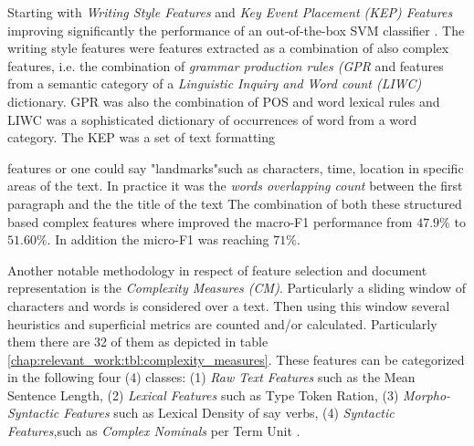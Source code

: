 Starting with \textit{Writing Style Features} and \textit{Key Event Placement (KEP) Features} improving significantly the performance of an out-of-the-box SVM classifier \parencite{dai2018fine}.  The writing style features were features extracted as a combination of also complex features, i.e. the combination of \textit{grammar production rules (GPR} and features from a semantic category of a \textit{Linguistic Inquiry and Word count (LIWC)} dictionary. GPR was also the combination of POS and word lexical rules and LIWC was a sophisticated dictionary of occurrences of word from a word category. The KEP was a set of text formatting

features or one could say "landmarks"such as characters, time, location in specific areas of the text. In practice it was the \textit{words overlapping count} between the first paragraph and the the title of the text The combination of both these structured based complex features where improved the macro-F1 performance from $47.9\%$ to $51.60\%$. In addition the micro-F1 was reaching $71\%$. 

Another notable methodology in respect of  feature selection and document representation is the \textit{Complexity Measures (CM)}.  Particularly a sliding window of characters and words is considered over a text. Then using this window several heuristics and superficial metrics are counted and/or calculated. Particularly them there are 32 of them as depicted in table \ref{chap:relevant_work:tbl:complexity_measures}. These features can be categorized in the following four (4) classes: (1) \textit{Raw Text Features} such as the Mean Sentence Length, (2) \textit{Lexical Features} such as Type Token Ration, (3) \textit{Morpho-Syntactic Features} such as Lexical Density of say verbs, (4) \textit{Syntactic Features},such as \textit{Complex Nominals} per Term Unit \parencite{strobel2018text}.

